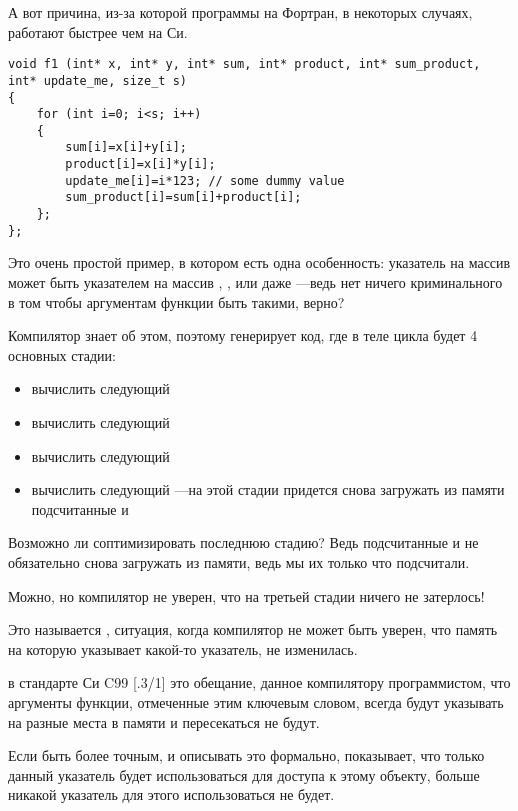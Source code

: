 
А вот причина, из-за которой программы на Фортран, в некоторых случаях, работают быстрее чем на Си.

\begin{lstlisting}
void f1 (int* x, int* y, int* sum, int* product, int* sum_product, int* update_me, size_t s)
{
	for (int i=0; i<s; i++)
	{
		sum[i]=x[i]+y[i];
		product[i]=x[i]*y[i];
		update_me[i]=i*123; // some dummy value
		sum_product[i]=sum[i]+product[i];	
	};
};
\end{lstlisting}

Это очень простой пример, в котором есть одна особенность: 
указатель на массив  может быть указателем на массив
, , или даже 
---ведь нет ничего криминального в том 
чтобы аргументам функции быть такими, верно?

Компилятор знает об этом, поэтому генерирует код, где в теле цикла будет 4 основных стадии:

\begin{itemize}
\item вычислить следующий 
\item вычислить следующий 
\item вычислить следующий 
\item вычислить следующий ---на этой стадии придется снова загружать из памяти подсчитанные
  и 
\end{itemize}

Возможно ли соптимизировать последнюю стадию?
Ведь подсчитанные  и  
не обязательно снова загружать из памяти, ведь мы их только что подсчитали.

Можно, но компилятор не уверен, что на третьей стадии ничего не затерлось!

Это называется
, ситуация, когда компилятор не может быть уверен, что память на которую указывает 
какой-то указатель, не изменилась.

 в стандарте Си C99 [.3/1]
это обещание, данное компилятору программистом, что аргументы функции, отмеченные этим ключевым словом,
всегда будут указывать на разные места в памяти и пересекаться не будут.

Если быть более точным, и описывать это формально,  показывает, что только данный указатель будет
использоваться для доступа к этому объекту, больше никакой указатель для
этого использоваться не будет.


